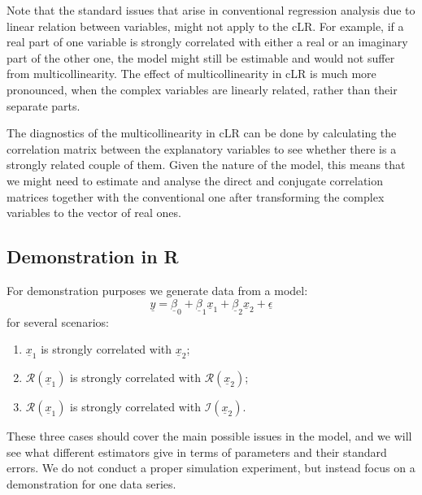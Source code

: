 \documentclass[
]{book}
\providecommand{\tightlist}{%
  \setlength{\itemsep}{0pt}\setlength{\parskip}{0pt}}
\begin{document}
Note that the standard issues that arise in conventional regression analysis due to linear relation between variables, might not apply to the cLR. For example, if a real part of one variable is strongly correlated with either a real or an imaginary part of the other one, the model might still be estimable and would not suffer from multicollinearity. The effect of multicollinearity in cLR is much more pronounced, when the complex variables are linearly related, rather than their separate parts.

The diagnostics of the multicollinearity in cLR can be done by calculating the correlation matrix between the explanatory variables to see whether there is a strongly related couple of them. Given the nature of the model, this means that we might need to estimate and analyse the direct and conjugate correlation matrices together with the conventional one after transforming the complex variables to the vector of real ones.

\hypertarget{demonstration-in-r-3}{%
\subsection{Demonstration in R}\label{demonstration-in-r-3}}

For demonstration purposes we generate data from a model:
\begin{equation*}
    \underline{y} = \underline{\beta}_0 + \underline{\beta}_1 \underline{x}_{1} + \underline{\beta}_2 \underline{x}_{2} + \underline{\epsilon}
\end{equation*}
for several scenarios:

\begin{enumerate}
\def\labelenumi{\arabic{enumi}.}
\tightlist
\item
  \(\underline{x}_{1}\) is strongly correlated with \(\underline{x}_{2}\);
\item
  \(\mathcal{R}\left(\underline{x}_{1}\right)\) is strongly correlated with \(\mathcal{R}\left(\underline{x}_{2}\right)\);
\item
  \(\mathcal{R}\left(\underline{x}_{1}\right)\) is strongly correlated with \(\mathcal{I}\left(\underline{x}_{2}\right)\).
\end{enumerate}

These three cases should cover the main possible issues in the model, and we will see what different estimators give in terms of parameters and their standard errors. We do not conduct a proper simulation experiment, but instead focus on a demonstration for one data series.
\end{document}
